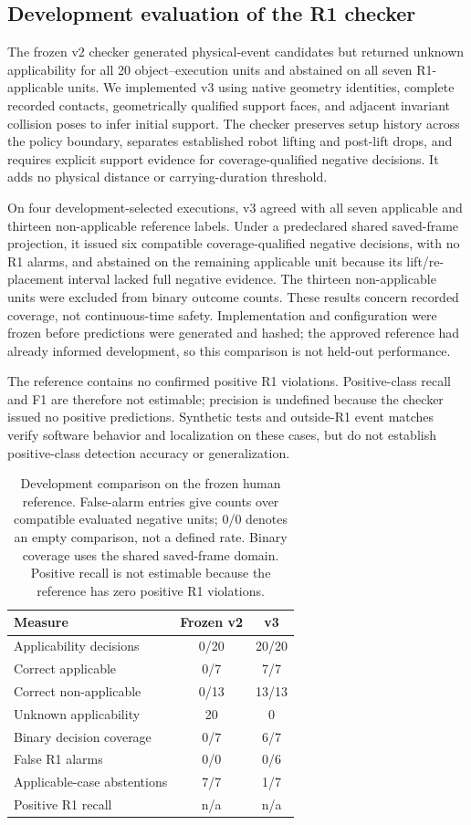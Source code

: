 \subsection{Development evaluation of the R1 checker}
The frozen v2 checker generated physical-event candidates but returned unknown applicability for all 20 object--execution units and abstained on all seven R1-applicable units. We implemented v3 using native geometry identities, complete recorded contacts, geometrically qualified support faces, and adjacent invariant collision poses to infer initial support. The checker preserves setup history across the policy boundary, separates established robot lifting and post-lift drops, and requires explicit support evidence for coverage-qualified negative decisions. It adds no physical distance or carrying-duration threshold.

On four development-selected executions, v3 agreed with all seven applicable and thirteen non-applicable reference labels. Under a predeclared shared saved-frame projection, it issued six compatible coverage-qualified negative decisions, with no R1 alarms, and abstained on the remaining applicable unit because its lift/re-placement interval lacked full negative evidence. The thirteen non-applicable units were excluded from binary outcome counts. These results concern recorded coverage, not continuous-time safety. Implementation and configuration were frozen before predictions were generated and hashed; the approved reference had already informed development, so this comparison is not held-out performance.

The reference contains no confirmed positive R1 violations. Positive-class recall and F1 are therefore not estimable; precision is undefined because the checker issued no positive predictions. Synthetic tests and outside-R1 event matches verify software behavior and localization on these cases, but do not establish positive-class detection accuracy or generalization.

\begin{table}[t]
\centering
\small
\begin{tabular}{lcc}
\hline
Measure & Frozen v2 & v3 \\
\hline
Applicability decisions & 0/20 & 20/20 \\
Correct applicable & 0/7 & 7/7 \\
Correct non-applicable & 0/13 & 13/13 \\
Unknown applicability & 20 & 0 \\
Binary decision coverage & 0/7 & 6/7 \\
False R1 alarms & 0/0 & 0/6 \\
Applicable-case abstentions & 7/7 & 1/7 \\
Positive R1 recall & n/a & n/a \\
\hline
\end{tabular}
\caption{Development comparison on the frozen human reference. False-alarm entries give counts over compatible evaluated negative units; 0/0 denotes an empty comparison, not a defined rate. Binary coverage uses the shared saved-frame domain. Positive recall is not estimable because the reference has zero positive R1 violations.}
\label{tab:r1-v2-v3}
\end{table}
